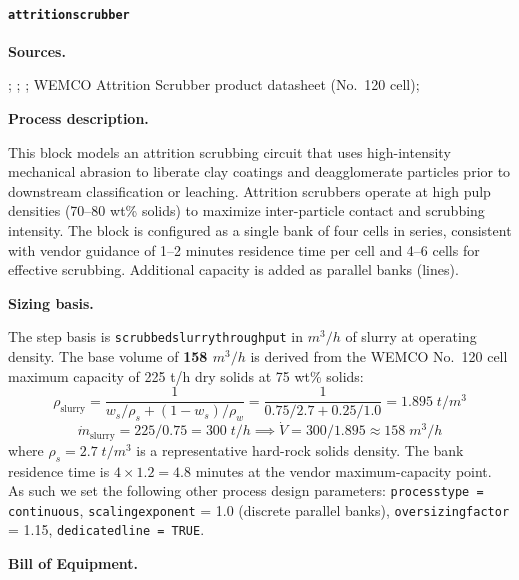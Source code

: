 \documentclass{article}
\renewcommand\_{\textunderscore\allowbreak}
\begin{document}
\clearpage
\paragraph{\texttt{attrition\_scrubber}}\label{app:04-methods-blockdefs-attritionscrubber}\leavevmode\par

\medskip
\noindent\textbf{Sources.}\quad

\citet{laneNI43101Technical2024}; \citet{sgscanadaincSK1300Technical2024}; \citet{riordanTonopahLithiumClaims2023}; \citet{flsmidthWEMCOAttritionScrubber2023} WEMCO Attrition Scrubber product datasheet (No.\ 120 cell); \citet{ulrichGuideChemicalEngineering1984}

\medskip
\noindent\textbf{Process description.}\quad

This block models an attrition scrubbing circuit that uses high-intensity mechanical abrasion to liberate clay coatings and deagglomerate particles prior to downstream classification or leaching. Attrition scrubbers operate at high pulp densities (70--80 wt\% solids) to maximize inter-particle contact and scrubbing intensity. The block is configured as a single bank of four cells in series, consistent with vendor guidance of 1--2 minutes residence time per cell and 4--6 cells for effective scrubbing. Additional capacity is added as parallel banks (lines).

\medskip
\noindent\textbf{Sizing basis.}\quad

The step basis is \texttt{scrubbed\_slurry\_throughput} in $\si{m^3/h}$ of slurry at operating density. The base volume of \textbf{158 $\si{m^3/h}$} is derived from the WEMCO No.\ 120 cell maximum capacity of 225 t/h dry solids at 75 wt\% solids:
\[
	\rho_{\text{slurry}} = \frac{1}{w_s/\rho_s + (1-w_s)/\rho_w} = \frac{1}{0.75/2.7 + 0.25/1.0} = 1.895\;\si{t/m^3}
\]
\[
	\dot{m}_{\text{slurry}} = 225/0.75 = 300\;\si{t/h} \implies \dot{V} = 300/1.895 \approx 158\;\si{m^3/h}
\]
where $\rho_s = 2.7\;\si{t/m^3}$ is a representative hard-rock solids density. The bank residence time is $4 \times 1.2 = 4.8$ minutes at the vendor maximum-capacity point. As such we set the following other process design parameters: \texttt{process\_type = continuous}, \texttt{scaling\_exponent} = 1.0 (discrete parallel banks), \texttt{oversizing\_factor} = 1.15, \texttt{dedicated\_line = TRUE}.

\medskip
\noindent\textbf{Bill of Equipment.}\quad
\end{document}
